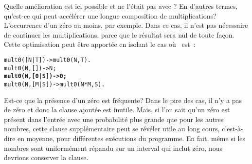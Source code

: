 Quelle amélioration est ici possible et ne l'était pas avec
? En d'autres termes, qu'est-ce qui peut accélérer une
longue composition de multiplications? L'occurrence d'un zéro au
moins, par exemple. Dans ce cas, il n'est pas nécessaire de continuer
les multiplications, parce que le résultat sera nul de toute
façon. Cette optimisation peut être apportée en isolant le cas où
~est~:
\begin{alltt}
mult0([N|T])   -> mult0(N,T).
mult0(N,   []) -> N;
\textbf{mult0(N,[0|S]) -> 0;}\hfill% \emph{Amélioration.}
mult0(N,[M|S]) -> mult0(N*M,S).
\end{alltt}
Est-ce que la présence d'un zéro est fréquente? Dans le pire des cas,
il n'y a pas de zéro et donc la clause ajoutée est inutile. Mais, si
l'on sait qu'un zéro est présent dans l'entrée avec une probabilité
plus grande que pour les autres nombres, cette clause supplémentaire
peut se révéler utile au long cours, c'est-à-dire en moyenne, pour
différentes exécutions du programme. En fait, même si les nombres sont
uniformément répandu sur un interval qui inclut zéro, nous devrions
conserver la clause.
\label{sec:tail_call_opt}


